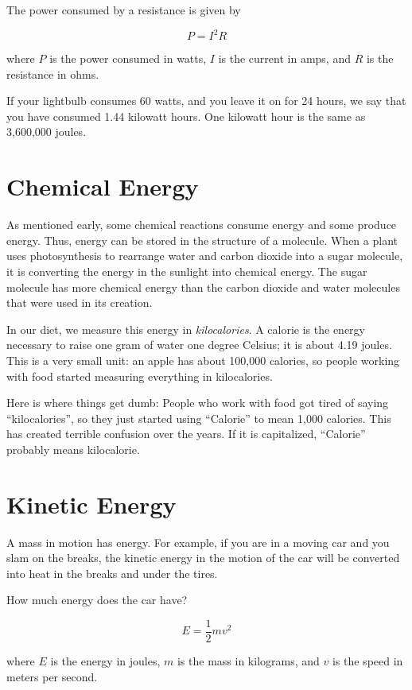 The power consumed by a resistance is given by

$$P = I^2R$$

where $P$ is the power consumed in watts, $I$ is the current in amps,
and $R$ is the resistance in ohms.

If your lightbulb consumes 60 watts, and you leave it on for 24 hours,
we say that you have consumed 1.44 kilowatt hours. One kilowatt hour
is the same as 3,600,000 joules.

\section{Chemical Energy}

As mentioned early, some chemical reactions consume energy and some
produce energy. Thus, energy can be stored in the structure of a
molecule. When a plant uses photosynthesis to rearrange water and
carbon dioxide into a sugar molecule, it is converting the energy in
the sunlight into chemical energy. The sugar molecule has more
chemical energy than the carbon dioxide and water molecules that were
used in its creation.

In our diet, we measure this energy in \textit{kilocalories}. A
calorie is the energy necessary to raise one gram of water one degree
Celsius; it is about 4.19 joules. This is a very small unit: an apple
has about 100,000 calories, so people working with food started
measuring everything in kilocalories.

Here is where things get dumb: People who work with food got tired of
saying ``kilocalories'', so they just started using ``Calorie'' to
mean 1,000 calories.  This has created terrible confusion over the
years. If it is capitalized, ``Calorie'' probably means kilocalorie.

\section{Kinetic Energy}

A mass in motion has energy. For example, if you are in a moving car
and you slam on the breaks, the kinetic energy in the motion of the
car will be converted into heat in the breaks and under the tires.

How much energy does the car have?

$$E = \frac{1}{2} m v^2$$

where $E$ is the energy in joules, $m$ is the mass in kilograms, and
$v$ is the speed in meters per second.

